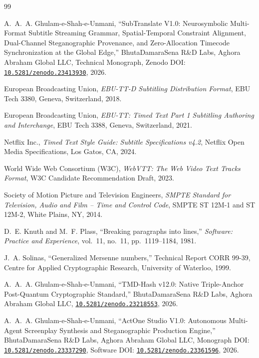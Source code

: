\documentclass[11pt,a4paper,reqno]{article}
\newcommand{\zenodo}[1]{\href{https://doi.org/10.5281/zenodo.#1}{\nolinkurl{10.5281/zenodo.#1}}}
\theoremstyle{definition}
\theoremstyle{remark}
\begin{document}
\begin{thebibliography}{99}

A.~A.~A. Ghulam-e-Shah-e-Unmani, ``SubTranslate V1.0: Neurosymbolic Multi-Format Subtitle Streaming Grammar, Spatial-Temporal Constraint Alignment, Dual-Channel Steganographic Provenance, and Zero-Allocation Timecode Synchronization at the Global Edge,'' BhutaDamaraSena R\&D Labs, Aghora Abraham Global LLC, Technical Monograph, Zenodo DOI: \zenodo{23413930}, 2026.

European Broadcasting Union, \emph{EBU-TT-D Subtitling Distribution Format}, EBU Tech 3380, Geneva, Switzerland, 2018.

European Broadcasting Union, \emph{EBU-TT: Timed Text Part 1 Subtitling Authoring and Interchange}, EBU Tech 3388, Geneva, Switzerland, 2021.

Netflix Inc., \emph{Timed Text Style Guide: Subtitle Specifications v4.2}, Netflix Open Media Specifications, Los Gatos, CA, 2024.

World Wide Web Consortium (W3C), \emph{WebVTT: The Web Video Text Tracks Format}, W3C Candidate Recommendation Draft, 2023.

Society of Motion Picture and Television Engineers, \emph{SMPTE Standard for Television, Audio and Film -- Time and Control Code}, SMPTE ST 12M-1 and ST 12M-2, White Plains, NY, 2014.

D.~E. Knuth and M.~F. Plass, ``Breaking paragraphs into lines,'' \emph{Software: Practice and Experience}, vol.~11, no.~11, pp.~1119--1184, 1981.

J.~A. Solinas, ``Generalized Mersenne numbers,'' Technical Report CORR 99-39, Centre for Applied Cryptographic Research, University of Waterloo, 1999.

A.~A.~A. Ghulam-e-Shah-e-Unmani, ``TMD-Hash v12.0: Native Triple-Anchor Post-Quantum Cryptographic Standard,'' BhutaDamaraSena R\&D Labs, Aghora Abraham Global LLC, \zenodo{23218553}, 2026.

A.~A.~A. Ghulam-e-Shah-e-Unmani, ``ActOne Studio V1.0: Autonomous Multi-Agent Screenplay Synthesis and Steganographic Production Engine,'' BhutaDamaraSena R\&D Labs, Aghora Abraham Global LLC, Monograph DOI: \zenodo{23337290}, Software DOI: \zenodo{23361596}, 2026.


\end{thebibliography}
\end{document}
